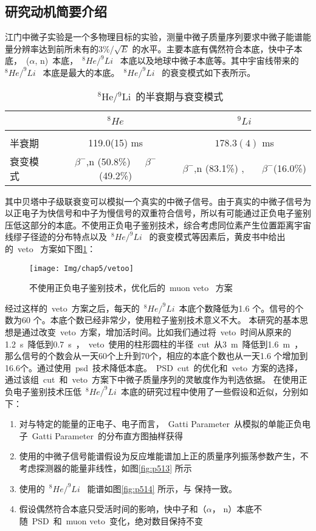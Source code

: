 \subsection{研究动机简要介绍}
江门中微子实验是一个多物理目标的实验，测量中微子质量序列要求中微子能谱能量分辨率达到前所未有的3\%/$\sqrt{E}$ 的水平。主要本底有偶然符合本底，快中子本底，~($\alpha$, n)~本底，~$^{8}He/^{9}Li$~ 本底以及地球中微子本底等。其中宇宙线带来的~$^{8}He/^{9}Li$~ 本底是最大的本底。~$^{8}He/^{9}Li$~ 的衰变模式如下表所示。
\begin{table}[htbp]
\centering  %
\begin{tabular}{lcc}  %
\hline
&~$^{8}He$~&~$^{9}Li$~ \\ \hline  %
\\ 半衰期&119.0(15) ms& $178.3(4)$ ms       %
\\ 衰变模式&$\beta^{-}$,n (50.8\%)~~~$\beta^{-}$(49.2\%) & $\beta^{-}$,n (83.1\%) , ~~~$\beta^{-}$(16.0\%)   %
\\ \hline
\end{tabular}
\caption{~$^{8}$He/$^{9}$Li~的半衰期与衰变模式}
\end{table}
其中贝塔中子级联衰变可以模拟一个真实的中微子信号。由于真实的中微子信号为以正电子为快信号和中子为慢信号的双重符合信号，所以有可能通过正负电子鉴别压低这部分的本底。不使用正负电子鉴别技术，综合考虑同位素产生位置距离宇宙线缪子径迹的分布特点以及~$^{8}He/^{9}Li$~ 的衰变模式等因素后，黄皮书中给出的~veto~ 方案如下图\ref{fig:p512}：
\begin{figure}[!htb]
  \centering
   \texttt{[image: Img/chap5/vetoo]}
    \caption{不使用正负电子鉴别技术，优化后的~muon veto~ 方案\citep{an2015neutrino}}
  \label{fig:p512}
\end{figure}
经过这样的~veto~方案之后，每天的~$^{8}He/^{9}Li$~本底个数降低为1.6 个。信号的个数为60 个。本底个数已经非常少，使用粒子鉴别技术意义不大。
本研究的基本思想是通过改变~veto~方案，增加活时间。比如我们通过将~veto~时间从原来的1.2~s~降低到0.7~s~，~veto~使用的柱形圆柱的半径~cut~从3~m~降低到1.6~m~，那么信号的个数会从一天60个上升到70个，相应的本底个数也从一天1.6 个增加到16.6个。通过使用~psd~技术降低本底。~PSD~cut~的优化和~veto~方案的选择，通过该组~cut~和~veto~方案下中微子质量序列的灵敏度作为判选依据。
在使用正负电子鉴别技术压低~$^{8}He/^{9}Li$~本底的研究过程中使用了一些假设和近似，分别如下：
\begin{enumerate}
\item 对与特定的能量的正电子、电子而言，~Gatti Parameter~从模拟的单能正负电子~Gatti Parameter~的分布直方图抽样获得
\item 使用的中微子信号能谱假设为反应堆能谱加上正的质量序列振荡参数产生，不考虑探测器的能量非线性，如图\ref{fig:p513} 所示
\item 使用的~$^{8}He/^{9}Li$~ 能谱如图\ref{fig:p514} 所示，与\citep{an2015neutrino} 保持一致。
\item 假设偶然符合本底只受活时间的影响，快中子和（$\alpha$， n）本底不随~PSD~和~muon veto~变化，绝对数目保持不变
\end{enumerate}
